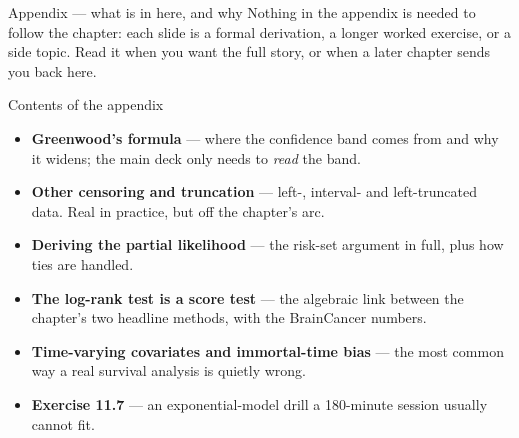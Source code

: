 \documentclass[aspectratio=169,11pt]{beamer}
\begin{document}
\begin{frame}{Appendix --- what is in here, and why}
  \scriptsize
  Nothing in the appendix is needed to follow the chapter: each slide is a
  formal derivation, a longer worked exercise, or a side topic. Read it when
  you want the full story, or when a later chapter sends you back here.
  \begin{block}{Contents of the appendix}
    \begin{itemize}
      \item \textbf{Greenwood's formula} --- where the confidence band comes from and why
            it widens; the main deck only needs to \emph{read} the band.
      \item \textbf{Other censoring and truncation} --- left-, interval- and
            left-truncated data. Real in practice, but off the chapter's arc.
      \item \textbf{Deriving the partial likelihood} --- the risk-set argument in full,
            plus how ties are handled.
      \item \textbf{The log-rank test is a score test} --- the algebraic link between the
            chapter's two headline methods, with the BrainCancer numbers.
      \item \textbf{Time-varying covariates and immortal-time bias} --- the most common
            way a real survival analysis is quietly wrong.
      \item \textbf{Exercise 11.7} --- an exponential-model drill a 180-minute session
            usually cannot fit.
    \end{itemize}
  \end{block}
\end{frame}
\end{document}
